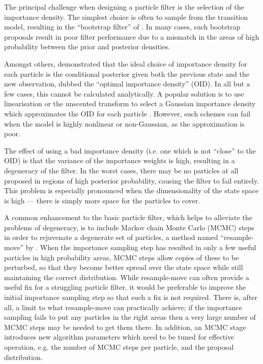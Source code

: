 \documentclass[12pt]{article}
\begin{document}
The principal challenge when designing a particle filter is the selection of the importance density. The simplest choice is often to sample from the transition model, resulting in the ``bootstrap filter'' of \citep{Gordon1993}. In many cases, such bootstrap proposals result in poor filter performance due to a mismatch in the areas of high probability between the prior and posterior densities.

Amongst others, \citet{Doucet2000a} demonstrated that the ideal choice of importance density for each particle is the conditional posterior given both the previous state and the new observation, dubbed the ``optimal importance density'' (OID). In all but a few cases, this cannot be calculated analytically. A popular solution is to use linearisation or the unscented transform to select a Gaussian importance density which approximates the OID for each particle \citep{Doucet2000a,Merwe2000}. However, such schemes can fail when the model is highly nonlinear or non-Gaussian, as the approximation is poor.

The effect of using a bad importance density (i.e. one which is not ``close'' to the OID) is that the variance of the importance weights is high, resulting in a degeneracy of the filter. In the worst cases, there may be no particles at all proposed in regions of high posterior probability, causing the filter to fail entirely. This problem is especially pronounced when the dimensionality of the state space is high --- there is simply more space for the particles to cover.

A common enhancement to the basic particle filter, which helps to alleviate the problems of degeneracy, is to include Markov chain Monte Carlo (MCMC) steps in order to rejuvenate a degenerate set of particles, a method named ``resample-move'' by \citet{Gilks2001}. When the importance sampling step has resulted in only a few useful particles in high probability areas, MCMC steps allow copies of these to be perturbed, so that they become better spread over the state space while still maintaining the correct distribution. While resample-move can often provide a useful fix for a struggling particle filter, it would be preferable to improve the initial importance sampling step so that such a fix is not required. There is, after all, a limit to what resample-move can practically achieve; if the importance sampling fails to put any particles in the right areas then a very large number of MCMC steps may be needed to get them there. In addition, an MCMC stage introduces new algorithm parameters which need to be tuned for effective operation, e.g. the number of MCMC steps per particle, and the proposal distribution.
\end{document}
